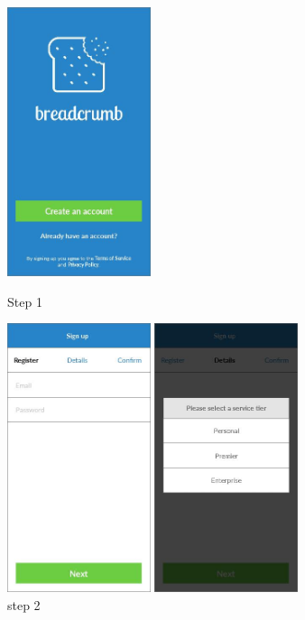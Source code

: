 \begin{figure}
  \subfigures
  \centering
  \begin{minipage}{4.6cm}
    \centering
    \includegraphics[width=4.2cm]{inc/ui_step1.jpg}
    \caption{Step 1}%
    \label{fig:ui_step1}
  \end{minipage}
  \begin{minipage}{4.6cm}
    \centering
    \includegraphics[width=4.2cm]{inc/ui_step2.jpg}
    \caption{step 2}%
    \label{fig:ui_step2}
  \end{minipage}
  \begin{minipage}{4.6cm}
    \centering
    \includegraphics[width=4.2cm]{inc/ui_step3.jpg}

\end{minipage}
\end{figure}
